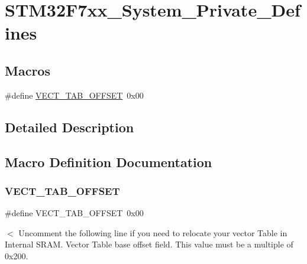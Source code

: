 \hypertarget{group___s_t_m32_f7xx___system___private___defines}{}\section{S\+T\+M32\+F7xx\+\_\+\+System\+\_\+\+Private\+\_\+\+Defines}
\label{group___s_t_m32_f7xx___system___private___defines}
\subsection*{Macros}
\begin{DoxyCompactItemize}
\item 
\#define \hyperlink{group___s_t_m32_f7xx___system___private___defines_ga40e1495541cbb4acbe3f1819bd87a9fe}{V\+E\+C\+T\+\_\+\+T\+A\+B\+\_\+\+O\+F\+F\+S\+ET}~0x00
\end{DoxyCompactItemize}


\subsection{Detailed Description}


\subsection{Macro Definition Documentation}
\mbox{\label{group___s_t_m32_f7xx___system___private___defines_ga40e1495541cbb4acbe3f1819bd87a9fe}} 
\subsubsection{\texorpdfstring{V\+E\+C\+T\+\_\+\+T\+A\+B\+\_\+\+O\+F\+F\+S\+ET}{VECT\_TAB\_OFFSET}}
{\footnotesize\ttfamily \#define V\+E\+C\+T\+\_\+\+T\+A\+B\+\_\+\+O\+F\+F\+S\+ET~0x00}

$<$ Uncomment the following line if you need to relocate your vector Table in Internal S\+R\+AM. Vector Table base offset field. This value must be a multiple of 0x200. 